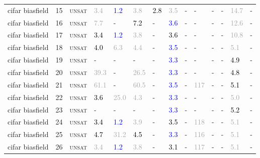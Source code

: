 \begin{center}
{\begin{longtable}{@{}llllllllllllll@{}}
cifar biasfield & 15 & \textsc{unsat} & \textcolor{darkgray}{3.4} & \textcolor{blue}{1.2} & \textcolor{darkgray}{3.8} & \textcolor{black}{2.8} & \textcolor{darkgray}{3.5} & - & - & - & - & \textcolor{darkgray}{14.7} & - \\
cifar biasfield & 16 & \textsc{unsat} & \textcolor{darkgray}{7.7} & - & \textcolor{black}{7.2} & - & \textcolor{blue}{3.6} & - & - & - & - & \textcolor{darkgray}{12.6} & - \\
cifar biasfield & 17 & \textsc{unsat} & \textcolor{black}{3.4} & \textcolor{blue}{1.2} & \textcolor{darkgray}{3.8} & - & \textcolor{black}{3.6} & - & - & - & - & \textcolor{darkgray}{10.8} & - \\
cifar biasfield & 18 & \textsc{unsat} & \textcolor{black}{4.0} & \textcolor{darkgray}{6.3} & \textcolor{darkgray}{4.4} & - & \textcolor{blue}{3.5} & - & - & - & - & \textcolor{darkgray}{5.1} & - \\
cifar biasfield & 19 & \textsc{unsat} & - & - & - & - & \textcolor{blue}{3.3} & - & - & - & - & \textcolor{black}{4.9} & - \\
cifar biasfield & 20 & \textsc{unsat} & \textcolor{darkgray}{39.3} & - & \textcolor{darkgray}{26.5} & - & \textcolor{blue}{3.3} & - & - & - & - & \textcolor{black}{4.8} & - \\
cifar biasfield & 21 & \textsc{unsat} & \textcolor{darkgray}{61.1} & - & \textcolor{darkgray}{60.5} & - & \textcolor{blue}{3.5} & - & \textcolor{darkgray}{117} & - & - & \textcolor{black}{5.1} & - \\
cifar biasfield & 22 & \textsc{unsat} & \textcolor{black}{3.6} & \textcolor{darkgray}{25.0} & \textcolor{darkgray}{4.3} & - & \textcolor{blue}{3.3} & - & - & - & - & \textcolor{darkgray}{5.0} & - \\
cifar biasfield & 23 & \textsc{unsat} & - & - & - & - & \textcolor{blue}{3.3} & - & - & - & - & \textcolor{black}{5.2} & - \\
cifar biasfield & 24 & \textsc{unsat} & \textcolor{black}{3.4} & \textcolor{blue}{1.2} & \textcolor{darkgray}{3.9} & - & \textcolor{black}{3.5} & - & \textcolor{darkgray}{118} & - & - & \textcolor{darkgray}{5.1} & - \\
cifar biasfield & 25 & \textsc{unsat} & \textcolor{black}{4.7} & \textcolor{darkgray}{31.2} & \textcolor{black}{4.5} & - & \textcolor{blue}{3.3} & - & \textcolor{darkgray}{116} & - & - & \textcolor{darkgray}{5.1} & - \\
cifar biasfield & 26 & \textsc{unsat} & \textcolor{darkgray}{3.4} & \textcolor{blue}{1.2} & \textcolor{darkgray}{3.8} & - & \textcolor{black}{3.1} & - & \textcolor{darkgray}{117} & - & - & \textcolor{darkgray}{5.1} & - \\

\end{longtable}}
\end{center}
